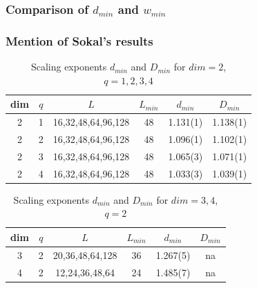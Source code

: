 \documentclass[pre,preprint]{revtex4}
\begin{document}


\subsubsection {Comparison of $d_{min}$ and $w_{min}$}

\subsubsection{ Mention of Sokal's results}



\begin{center}
\begin {table}[ht]
\addtolength{\tabcolsep}{5pt}
\begin{tabular}{|c| c |c|c|c|c|}
\hline
 dim  &  $q$  &  $L$                   &  $L_{min}$  &   $d_{min}$  &   $D_{min}$  \\
\hline
   2  &  1  &  16,32,48,64,96,128  &       48  &  1.131(1)  &  1.138(1)  \\
   2  &  2  &  16,32,48,64,96,128  &       48  &  1.096(1)  &  1.102(1)  \\
   2  &  3  &  16,32,48,64,96,128  &       48  &  1.065(3)  &  1.071(1)  \\
   2  &  4  &  16,32,48,64,96,128  &       48  &  1.033(3)  &  1.039(1)  \\
\hline
\end{tabular}
\caption{Scaling exponents $d_{min}$ and $D_{min}$ for $dim=2$, $q=1,2,3,4$}
\label{tab:D2vals}
\end{table}
\end{center}


\begin{center}
\begin {table}[ht]
\addtolength{\tabcolsep}{5pt}
\begin{tabular}{|c| c |c|c|c|c|}
\hline
dim  &  $q$  &  $L$                   &  $L_{min}$  &   $d_{min}$  &   $D_{min}$  \\
\hline
   3  &  2  &  20,36,48,64,128  &       36  &  1.267(5)  &  na       \\
   4  &  2  &  12,24,36,48,64   &       24  &  1.485(7)  &  na       \\
\hline
\end{tabular}
\caption{Scaling exponents $d_{min}$ and $D_{min}$ for $dim=3,4$, $q=2$}
\label{tab:D3and4vals}
\end{table}
\end{center}
\end{document}
